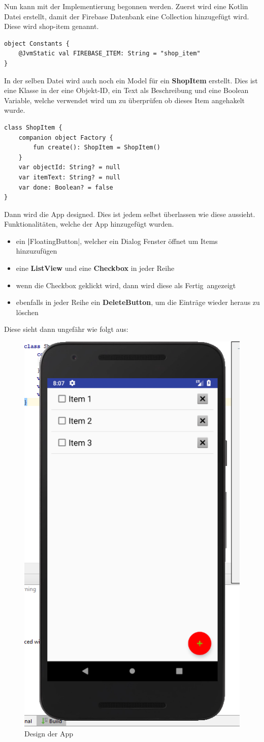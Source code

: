 \clearpage

Nun kann mit der Implementierung begonnen werden. Zuerst wird eine Kotlin Datei erstellt, damit der Firebase Datenbank eine Collection hinzugefügt wird. Diese wird shop-item genannt.

\begin{lstlisting}
object Constants {
	@JvmStatic val FIREBASE_ITEM: String = "shop_item"
}
\end{lstlisting}

In der selben Datei wird auch noch ein Model für ein \textbf{ShopItem} erstellt. Dies ist eine Klasse in der eine Objekt-ID, ein Text als Beschreibung und eine Boolean Variable, welche verwendet wird um zu überprüfen ob dieses Item angehakelt wurde.

\begin{lstlisting}
class ShopItem {
	companion object Factory {
		fun create(): ShopItem = ShopItem()
	}
	var objectId: String? = null
	var itemText: String? = null
	var done: Boolean? = false
}
\end{lstlisting}

Dann wird die App designed. Dies ist jedem selbst überlassen wie diese aussieht. Funktionalitäten, welche der App hinzugefügt wurden.
\begin{itemize}
	\item ein \textbf|FloatingButton|, welcher ein Dialog Fenster öffnet um Items hinzuzufügen
	\item eine \textbf{ListView} und eine \textbf{Checkbox} in jeder Reihe
	\item wenn die Checkbox geklickt wird, dann wird diese als \glqq Fertig\grqq \ angezeigt
	\item ebenfalls in jeder Reihe ein \textbf{DeleteButton}, um die Einträge wieder heraus zu löschen
\end{itemize}

\clearpage

Diese sieht dann ungefähr wie folgt aus:

\begin{figure}[!h]
	\begin{center}
		\includegraphics[width=0.4\linewidth]{images/app-design.png}
		\caption{Design der App}
	\end{center}
\end{figure}

